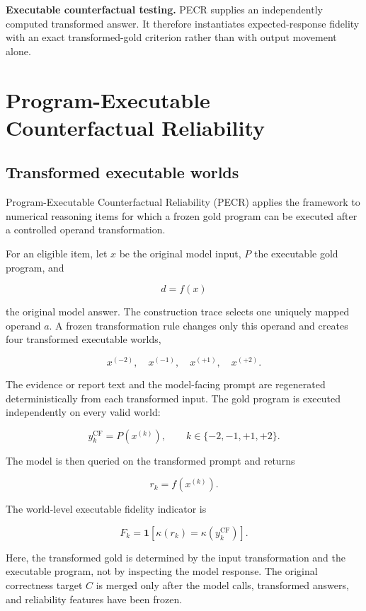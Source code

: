 \documentclass[11pt]{article}
\begin{document}
\textbf{Executable counterfactual testing.} PECR supplies an independently computed transformed answer. It therefore instantiates expected-response fidelity with an exact transformed-gold criterion rather than with output movement alone.

\section{Program-Executable Counterfactual Reliability}

\subsection{Transformed executable worlds}

Program-Executable Counterfactual Reliability (PECR) applies the framework to numerical reasoning items for which a frozen gold program can be executed after a controlled operand transformation.

For an eligible item, let \(x\) be the original model input, \(P\) the executable gold program, and

\[
d=f(x)
\]

the original model answer. The construction trace selects one uniquely mapped operand \(a\). A frozen transformation rule changes only this operand and creates four transformed executable worlds,

\[
x^{(-2)},\quad x^{(-1)},\quad x^{(+1)},\quad x^{(+2)}.
\]

The evidence or report text and the model-facing prompt are regenerated deterministically from each transformed input. The gold program is executed independently on every valid world:

\[
y_k^{\mathrm{CF}}=P\!\left(x^{(k)}\right),
\qquad
k\in\{-2,-1,+1,+2\}.
\]

The model is then queried on the transformed prompt and returns

\[
r_k=f\!\left(x^{(k)}\right).
\]

The world-level executable fidelity indicator is

\[
F_k
=
\mathbf{1}\!\left[
\kappa(r_k)=\kappa\!\left(y_k^{\mathrm{CF}}\right)
\right].
\]

Here, the transformed gold is determined by the input transformation and the executable program, not by inspecting the model response. The original correctness target \(C\) is merged only after the model calls, transformed answers, and reliability features have been frozen.
\end{document}
